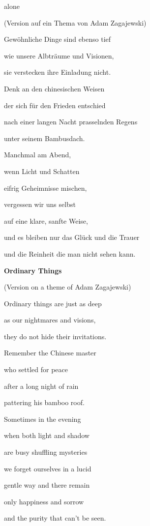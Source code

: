 alone


\bigskip


\bigskip


\bigskip


\bigskip


(Version auf ein Thema von Adam Zagajewski)


\bigskip


\bigskip

Gewöhnliche Dinge sind ebenso tief

wie unsere Albträume und Visionen,

sie verstecken ihre Einladung nicht.


\bigskip

Denk an den chinesischen Weisen

der sich für den Frieden entschied 

{\color{black}
nach einer langen Nacht prasselnden Regens}

unter seinem Bambusdach.


\bigskip

Manchmal am Abend,

wenn Licht und Schatten

eifrig Geheimnisse mischen,


\bigskip

vergessen wir uns selbst

auf eine klare, sanfte Weise,

und es bleiben nur das Glück und die Trauer 

und die Reinheit die man nicht sehen kann.

\clearpage
\bigskip

{\bfseries
Ordinary Things}

(Version on a theme of Adam Zagajewski)


\bigskip


\bigskip

Ordinary things are just as deep

as our nightmares and visions,

they do not hide their invitations.


\bigskip

Remember the Chinese master

who settled for peace

after a long night of rain

pattering his bamboo roof.


\bigskip

Sometimes in the evening

when both light and shadow

are busy shuffling mysteries


\bigskip

we forget ourselves in a lucid

gentle way and there remain 

only happiness and sorrow

and the purity that can't be seen.


\bigskip

